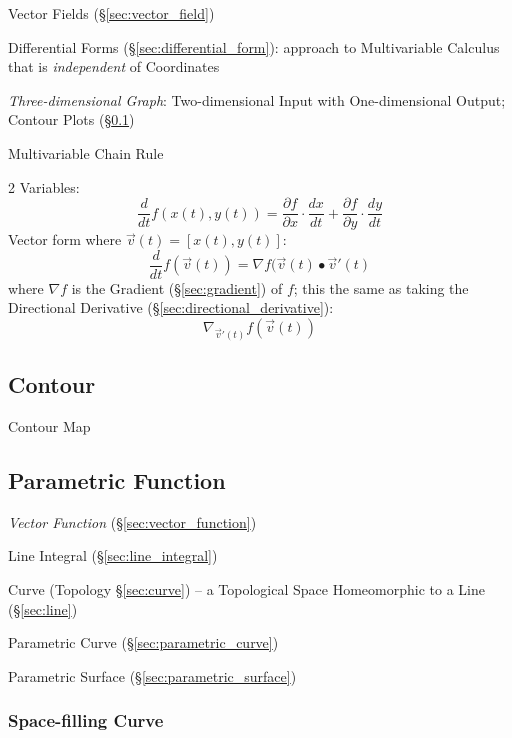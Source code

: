 \fist Vector Fields (\S\ref{sec:vector_field})

\fist Differential Forms (\S\ref{sec:differential_form}): approach to
Multivariable Calculus that is \emph{independent} of Coordinates

\emph{Three-dimensional Graph}: Two-dimensional Input with One-dimensional
Output; Contour Plots (\S\ref{sec:contour})

Multivariable Chain Rule

2 Variables:
\[
  \frac{d}{dt} f(x(t),y(t)) =
    \frac{\partial{f}}{\partial{x}} \cdot \frac{dx}{dt}
      + \frac{\partial{f}}{\partial{y}} \cdot \frac{dy}{dt}
\]
Vector form where $\vec{v}(t) = [x(t),y(t)]$:
\[
  \frac{d}{dt}f(\vec{v}(t)) = \nabla{f(\vec{v}(t)}\bullet{\vec{v}'(t)}
\]
where $\nabla{f}$ is the Gradient (\S\ref{sec:gradient}) of $f$; this the same
as taking the Directional Derivative (\S\ref{sec:directional_derivative}):
\[
  \nabla_{\vec{v}'(t)}f(\vec{v}(t))
\]



\subsection{Contour}\label{sec:contour}

Contour Map



\subsection{Parametric Function}\label{sec:parametric_function}

\fist \emph{Vector Function} (\S\ref{sec:vector_function})

Line Integral (\S\ref{sec:line_integral})

\fist Curve (Topology \S\ref{sec:curve}) -- a Topological Space Homeomorphic to
a Line (\S\ref{sec:line})

\fist Parametric Curve (\S\ref{sec:parametric_curve})

\fist Parametric Surface (\S\ref{sec:parametric_surface})



\subsubsection{Space-filling Curve}\label{sec:space_filling_curve}

